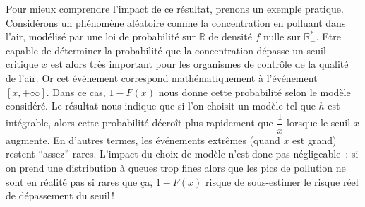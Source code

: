 Pour mieux comprendre l'impact de ce résultat, prenons un exemple
pratique. Considérons un phénomène aléatoire comme la concentration en
polluant dans l'air, modélisé par une loi de probabilité sur
\(\mathbb{R}\) de densité \(f\) nulle sur \(\mathbb{R}_-^\ast\). Etre
capable de déterminer la probabilité que la concentration dépasse un
seuil critique \(x\) est alors très important pour les organismes de
contrôle de la qualité de l'air. Or cet événement correspond
mathématiquement à l'événement \([x,+\infty]\). Dans ce cas,
\(1 - F(x)\) nous donne cette probabilité selon le modèle considéré. Le
résultat nous indique que si l'on choisit un modèle tel que \(h\) est
intégrable, alors cette probabilité décroît plus rapidement que
\(\dfrac{1}{x}\) lorsque le seuil \(x\) augmente. En d'autres termes,
les événements extrêmes (quand \(x\) est grand) restent ``assez'' rares.
L'impact du choix de modèle n'est donc pas négligeable~: si on prend une
distribution à queues trop fines alors que les pics de pollution ne sont
en réalité pas si rares que ça, \(1-F(x)\) risque de sous-estimer le
risque réel de dépassement du seuil\,!

\label{I-answer-dlfdr-reciproque}

